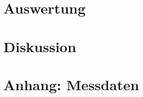 \section{Auswertung}

\section{Diskussion}

\section*{Anhang: Messdaten}

\nocite{geschke}
\nocite{walcher}
\nocite{demtroeder}
\printbibliography


